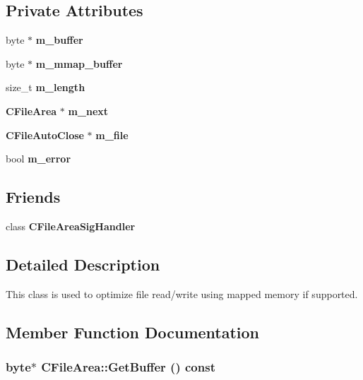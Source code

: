 \subsection*{Private Attributes}
\begin{DoxyCompactItemize}
\item 
byte $\ast$ {\bf m\_\-buffer}
\item 
byte $\ast$ {\bf m\_\-mmap\_\-buffer}\label{classCFileArea_a9678ddd4a798a9812a6fc5b5c1203c44}

\item 
size\_\-t {\bf m\_\-length}\label{classCFileArea_aff95df3e74a696f2b4c2a139fa0eaee7}

\item 
{\bf CFileArea} $\ast$ {\bf m\_\-next}\label{classCFileArea_a0e8ab77a84eb0d0eb5c8029c0db8c689}

\item 
{\bf CFileAutoClose} $\ast$ {\bf m\_\-file}\label{classCFileArea_a309b40d84efdccf99a3f60d02d471b9b}

\item 
bool {\bf m\_\-error}\label{classCFileArea_a09ec587b4457a78cb1c669bb9e901288}

\end{DoxyCompactItemize}
\subsection*{Friends}
\begin{DoxyCompactItemize}
\item 
class {\bf CFileAreaSigHandler}\label{classCFileArea_a39b527093c4d955b23d5d6377a1cb236}

\end{DoxyCompactItemize}


\subsection{Detailed Description}
This class is used to optimize file read/write using mapped memory if supported. 

\subsection{Member Function Documentation}
\subsubsection[{GetBuffer}]{\setlength{\rightskip}{0pt plus 5cm}byte$\ast$ CFileArea::GetBuffer () const\hspace{0.3cm}{\ttfamily  [inline]}}\label{classCFileArea_aeb451a19e50b1cb41b81f57b29335e2b}


